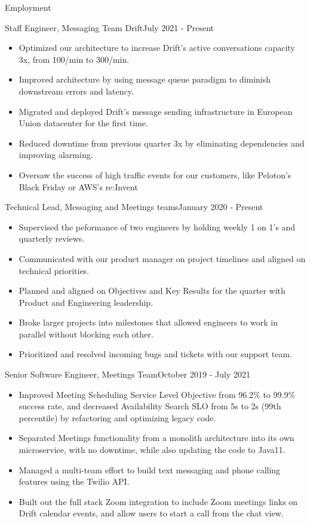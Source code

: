 \documentclass[]{mcdowellcv}
\begin{document}
	\begin{cvsection}{Employment}
		\begin{cvsubsection}{Staff Engineer, \normalfont Messaging Team }{Drift}{July 2021 - Present}
			\begin{itemize}
				\item Optimized our architecture to increase Drift's active conversations capacity 3x, from 100/min to 300/min.
				\item Improved architecture by using message queue paradigm to diminish downstream errors and latency.
				\item Migrated and deployed Drift's message sending infrastructure in European Union datacenter for the first time.
				\item Reduced downtime from previous quarter  3x by eliminating dependencies and improving alarming.
				\item Oversaw the success of high traffic events for our customers, like Peloton's Black Friday or AWS's re:Invent
			\end{itemize}
		\end{cvsubsection}
		\begin{cvsubsection2}{Technical Lead, \normalfont Messaging and Meetings teams}{January 2020 - Present}
			\begin{itemize}
				\item Supervised the peformance of two engineers by holding weekly 1 on 1's and quarterly reviews.
				\item Communicated with our product manager on project timelines and aligned on technical priorities.
				\item Planned and aligned on Objectives and Key Results for the quarter with Product and Engineering leadership.
				\item Broke larger projects into milestones that allowed engineers to work in parallel without blocking each other.
				\item Prioritized and resolved incoming bugs and tickets with our support team.
			\end{itemize}
		\end{cvsubsection2}
		\begin{cvsubsection2}{Senior Software Engineer, \normalfont Meetings Team}{October 2019 - July 2021}		
			\begin{itemize}
				\item Improved Meeting Scheduling Service Level Objective from 96.2\% to 99.9\% success rate, and decreased Availability Search SLO from 5s to 2s (99th percentile) by refactoring and optimizing legacy code.
				\item Separated Meetings functionality from a monolith architecture into its own microservice, with no downtime, while also updating the code to Java11.
				\item Managed a multi-team effort to build text messaging and phone calling features using the Twilio API.   
				\item Built out the full stack Zoom integration to include Zoom meetings links on Drift calendar events, and allow users to start a call from the chat view.
			\end{itemize}
		\end{cvsubsection2}
		

\end{cvsection}
\end{document}
